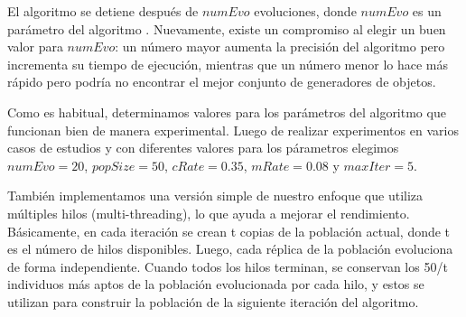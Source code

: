 El algoritmo se detiene después de $numEvo$ 
evoluciones, donde $numEvo$ es un parámetro del algoritmo . 
Nuevamente, existe un compromiso al elegir un buen valor para $numEvo$: un número mayor aumenta la precisión del algoritmo pero incrementa su tiempo de ejecución, 
mientras que un número menor lo hace más rápido pero podría no encontrar el
mejor conjunto de generadores de objetos.


Como es habitual, determinamos valores para los parámetros del algoritmo que
funcionan bien de manera experimental. Luego de realizar experimentos en
varios casos de estudios y con diferentes valores para los párametros 
elegimos $numEvo=20$, $popSize=50$, $cRate=0.35$, $mRate=0.08$ 
y $maxIter=5$. 


También implementamos una versión simple de nuestro enfoque que utiliza
múltiples hilos (multi-threading), lo que ayuda a mejorar el rendimiento.
Básicamente, en cada iteración se crean t copias de la población actual, donde t
es el número de hilos disponibles. Luego, cada réplica de la población
evoluciona de forma independiente. Cuando todos los hilos terminan, se conservan
los 50/t individuos más aptos de la población evolucionada por cada hilo, y
estos se utilizan para construir la población de la siguiente iteración del
algoritmo. 

